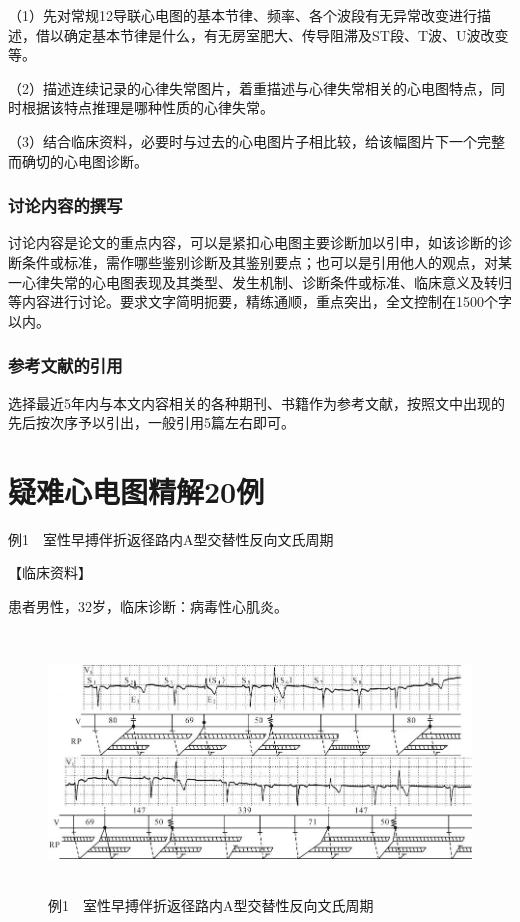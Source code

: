 （1）先对常规12导联心电图的基本节律、频率、各个波段有无异常改变进行描述，借以确定基本节律是什么，有无房室肥大、传导阻滞及ST段、T波、U波改变等。

（2）描述连续记录的心律失常图片，着重描述与心律失常相关的心电图特点，同时根据该特点推理是哪种性质的心律失常。

（3）结合临床资料，必要时与过去的心电图片子相比较，给该幅图片下一个完整而确切的心电图诊断。

\protect\hypertarget{text00058.htmlux5cux23subid714}{}{}

\subsection{讨论内容的撰写}

讨论内容是论文的重点内容，可以是紧扣心电图主要诊断加以引申，如该诊断的诊断条件或标准，需作哪些鉴别诊断及其鉴别要点；也可以是引用他人的观点，对某一心律失常的心电图表现及其类型、发生机制、诊断条件或标准、临床意义及转归等内容进行讨论。要求文字简明扼要，精练通顺，重点突出，全文控制在1500个字以内。

\protect\hypertarget{text00058.htmlux5cux23subid715}{}{}

\subsection{参考文献的引用}

选择最近5年内与本文内容相关的各种期刊、书籍作为参考文献，按照文中出现的先后按次序予以引出，一般引用5篇左右即可。

\protect\hypertarget{text00059.html}{}{}

\protect\hypertarget{text00059.htmlux5cux23chapter59}{}{}

\chapter{疑难心电图精解20例}

例1　室性早搏伴折返径路内A型交替性反向文氏周期

【临床资料】

患者男性，32岁，临床诊断：病毒性心肌炎。

\begin{figure}[!htbp]
 \centering
 \includegraphics[width=5.92708in,height=2.71875in]{./images/Image00759.jpg}
 \captionsetup{justification=centering}
 \caption{例1　室性早搏伴折返径路内A型交替性反向文氏周期}
 \label{fig50-1}
  \end{figure} 

